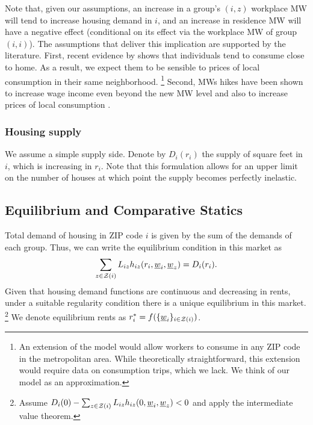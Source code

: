 Note that, given our assumptions, an increase in a group's $(i,z)$ workplace MW 
will tend to increase housing demand in $i$, and an increase in residence MW
will have a negative effect (conditional on its effect via the workplace MW
of group $(i,i)$).
The assumptions that deliver this implication are supported by the literature.
First, recent evidence by \textcite{MiyauchiEtAl2021} shows that individuals tend 
to consume close to home.
As a result, we expect them to be sensible to prices of local consumption in their 
same neighborhood.%
\footnote{An extension of the model would allow workers to consume in any ZIP code
in the metropolitan area.
While theoretically straightforward, this extension would require data on consumption
trips, which we lack.
We think of our model as an approximation.}
Second, MWs hikes have been shown to increase wage income even beyond the new MW 
level \parencite[e.g.,][]{CegnizEtAl2019} 
and also to increase prices of local consumption 
\parencite[e.g.,][]{AllegrettoReich2018, Leung2021}.

\subsubsection*{Housing supply}

We assume a simple supply side. Denote by $D_i(r_i)$ the supply of square feet in 
$i$, which is increasing in $r_i$.
Note that this formulation allows for an upper limit on the number of houses at 
which point the supply becomes perfectly inelastic.

\subsection{Equilibrium and Comparative Statics}

Total demand of housing in ZIP code $i$ is given by the sum of the demands of each group. 
Thus, we can write the equilibrium condition in this market as
\begin{equation}\label{eq:equilibrium}
	\sum_{z\in\mathcal{Z}(i)} L_{iz} h_{iz} (r_i, \underline{w}_i, \underline{w}_z) = D_i(r_i) .
\end{equation}
Given that housing demand functions are continuous and decreasing in rents, 
under a suitable regularity condition there is a unique equilibrium in this market.%
\footnote{Assume $D_i(0) - \sum_{z\in\mathcal{Z}(i)} L_{iz} h_{iz} (0, \underline{w}_i, \underline{w}_z) < 0$
and apply the intermediate value theorem.}
We denote equilibrium rents as $r^*_i = f(\{\underline{w}_i\}_{i\in\mathcal{Z}(i)})$.

